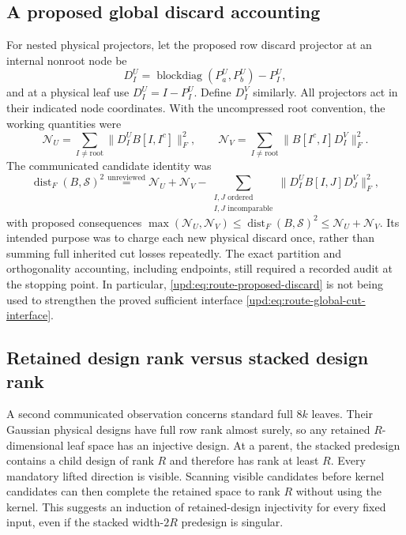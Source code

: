 \documentclass[11pt,oneside,openany,a4paper]{book}
\numberwithin{equation}{chapter}
\theoremstyle{definition}
\theoremstyle{remark}
\DeclareMathOperator{\diag}{blockdiag}\DeclareMathOperator{\range}{range}
\begin{document}
\subsection{A proposed global discard accounting}

For nested physical projectors, let the proposed row discard projector
at an internal nonroot node be
\[
 D_I^U=\diag(P_a^U,P_b^U)-P_I^U,
\]
and at a physical leaf use $D_I^U=I-P_I^U$.  Define $D_I^V$ similarly.
All projectors act in their indicated node coordinates.  With the
uncompressed root convention, the working quantities were
\[
 \mathcal N_U=\sum_{I\ne\mathrm{root}}
       \lVert D_I^U B[I,I^c]\rVert_F^2,
 \qquad
 \mathcal N_V=\sum_{I\ne\mathrm{root}}
       \lVert B[I^c,I]D_I^V\rVert_F^2.
\]
The communicated candidate identity was
\begin{equation}
 \operatorname{dist}_F(B,\mathcal S)^2
 \mathrel{\stackrel{\text{unreviewed}}{=}}
 \mathcal N_U+\mathcal N_V
 -\sum_{\substack{I,J\text{ ordered}\\I,J\text{ incomparable}}}
       \lVert D_I^U B[I,J]D_J^V\rVert_F^2,
 \label{upd:eq:route-proposed-discard}
\end{equation}
with proposed consequences
$\max(\mathcal N_U,\mathcal N_V)
\leq\operatorname{dist}_F(B,\mathcal S)^2
\leq\mathcal N_U+\mathcal N_V$.
Its intended purpose was to charge each new physical discard once,
rather than summing full inherited cut losses repeatedly.  The exact
partition and orthogonality accounting, including endpoints, still
required a recorded audit at the stopping point.  In particular,
\eqref{upd:eq:route-proposed-discard} is not being used to strengthen the
proved sufficient interface \eqref{upd:eq:route-global-cut-interface}.

\subsection{Retained design rank versus stacked design rank}

A second communicated observation concerns standard full $8k$ leaves.
Their Gaussian physical designs have full row rank almost surely, so
any retained $R$-dimensional leaf space has an injective design.  At a
parent, the stacked predesign contains a child design of rank $R$ and
therefore has rank at least $R$.  Every mandatory lifted direction is
visible.  Scanning visible candidates before kernel candidates can
then complete the retained space to rank $R$ without using the kernel.
This suggests an induction of retained-design injectivity for every
fixed input, even if the stacked width-$2R$ predesign is singular.
\end{document}

